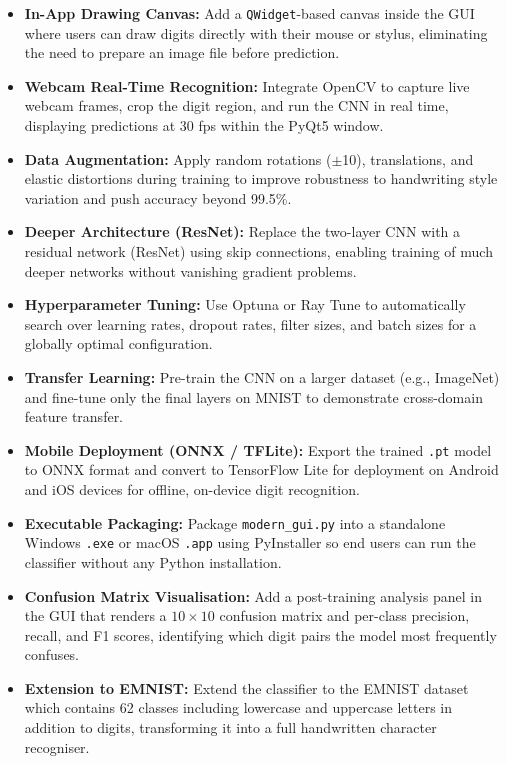 \documentclass[12pt,a4paper,openany]{report}
\begin{document}
\begin{itemize}
    \item \textbf{In-App Drawing Canvas:} Add a \texttt{QWidget}-based canvas inside the GUI where users can draw digits directly with their mouse or stylus, eliminating the need to prepare an image file before prediction.
    \item \textbf{Webcam Real-Time Recognition:} Integrate OpenCV to capture live webcam frames, crop the digit region, and run the CNN in real time, displaying predictions at 30 fps within the PyQt5 window.
    \item \textbf{Data Augmentation:} Apply random rotations ($\pm$10\textdegree), translations, and elastic distortions during training to improve robustness to handwriting style variation and push accuracy beyond 99.5\%.
    \item \textbf{Deeper Architecture (ResNet):} Replace the two-layer CNN with a residual network (ResNet) using skip connections, enabling training of much deeper networks without vanishing gradient problems.
    \item \textbf{Hyperparameter Tuning:} Use Optuna or Ray Tune to automatically search over learning rates, dropout rates, filter sizes, and batch sizes for a globally optimal configuration.
    \item \textbf{Transfer Learning:} Pre-train the CNN on a larger dataset (e.g., ImageNet) and fine-tune only the final layers on MNIST to demonstrate cross-domain feature transfer.
    \item \textbf{Mobile Deployment (ONNX / TFLite):} Export the trained \texttt{.pt} model to ONNX format and convert to TensorFlow Lite for deployment on Android and iOS devices for offline, on-device digit recognition.
    \item \textbf{Executable Packaging:} Package \texttt{modern\_gui.py} into a standalone Windows \texttt{.exe} or macOS \texttt{.app} using PyInstaller so end users can run the classifier without any Python installation.
    \item \textbf{Confusion Matrix Visualisation:} Add a post-training analysis panel in the GUI that renders a $10 \times 10$ confusion matrix and per-class precision, recall, and F1 scores, identifying which digit pairs the model most frequently confuses.
    \item \textbf{Extension to EMNIST:} Extend the classifier to the EMNIST dataset which contains 62 classes including lowercase and uppercase letters in addition to digits, transforming it into a full handwritten character recogniser.

\end{itemize}
\end{document}
